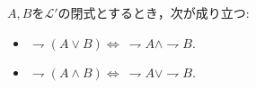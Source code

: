 	
	\begin{screen}
		\begin{logicalthm}[De Morganの法則]
			$A,B$を$\mathcal{L}'$の閉式とするとき，次が成り立つ:
			\begin{itemize}
				\item $\rightharpoondown (A \vee B) \Longleftrightarrow\ \rightharpoondown A \wedge \rightharpoondown B$.
			
				\item $\rightharpoondown (A \wedge B) \Longleftrightarrow\ \rightharpoondown A \vee \rightharpoondown B$.
			\end{itemize}
		\end{logicalthm}
	\end{screen}
	
